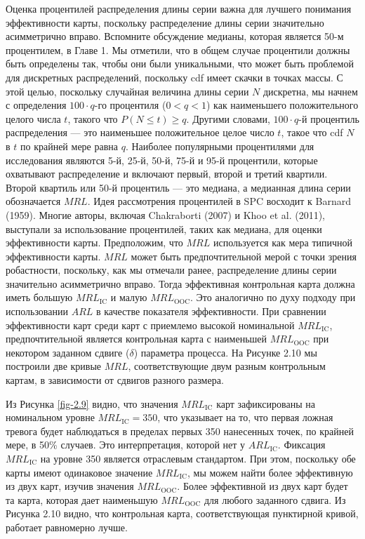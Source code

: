 Оценка процентилей распределения длины серии важна для лучшего понимания эффективности карты, поскольку распределение длины серии значительно асимметрично вправо. Вспомните обсуждение медианы, которая является 50-м процентилем, в Главе 1. Мы отметили, что в общем случае процентили должны быть определены так, чтобы они были уникальными, что может быть проблемой для дискретных распределений, поскольку cdf имеет скачки в точках массы. С этой целью, поскольку случайная величина длины серии \(N\) дискретна, мы начнем с определения \(100 \cdot q\)-го процентиля (\(0 < q < 1\)) как наименьшего положительного целого числа \(t\), такого что \(P(N \leq t) \geq q\). Другими словами, \(100 \cdot q\)-й процентиль распределения — это наименьшее положительное целое число \(t\), такое что cdf \(N\) в \(t\) по крайней мере равна \(q\). Наиболее популярными процентилями для исследования являются 5-й, 25-й, 50-й, 75-й и 95-й процентили, которые охватывают распределение и включают первый, второй и третий квартили. Второй квартиль или 50-й процентиль — это медиана, а медианная длина серии обозначается \(MRL\). Идея рассмотрения процентилей в SPC восходит к Barnard (1959). Многие авторы, включая Chakraborti (2007) и Khoo et al. (2011), выступали за использование процентилей, таких как медиана, для оценки эффективности карты. Предположим, что \(MRL\) используется как мера типичной эффективности карты. \(MRL\) может быть предпочтительной мерой с точки зрения робастности, поскольку, как мы отмечали ранее, распределение длины серии значительно асимметрично вправо. Тогда эффективная контрольная карта должна иметь большую \(MRL_{\text{IC}}\) и малую \(MRL_{\text{OOC}}\). Это аналогично по духу подходу при использовании \(ARL\) в качестве показателя эффективности. При сравнении эффективности карт среди карт с приемлемо высокой номинальной \(MRL_{\text{IC}}\), предпочтительной является контрольная карта с наименьшей \(MRL_{\text{OOC}}\) при некотором заданном сдвиге (\(\delta\)) параметра процесса. На Рисунке 2.10 мы построили две кривые \(MRL\), соответствующие двум разным контрольным картам, в зависимости от сдвигов разного размера.

Из Рисунка \ref{fig-2.9} видно, что значения \(MRL_{\text{IC}}\) карт зафиксированы на номинальном уровне \(MRL_{\text{IC}} = 350\), что указывает на то, что первая ложная тревога будет наблюдаться в пределах первых 350 нанесенных точек, по крайней мере, в 50\% случаев. Это интерпретация, которой нет у \(ARL_{\text{IC}}\). Фиксация \(MRL_{\text{IC}}\) на уровне 350 является отраслевым стандартом. При этом, поскольку обе карты имеют одинаковое значение \(MRL_{\text{IC}}\), мы можем найти более эффективную из двух карт, изучив значения \(MRL_{\text{OOC}}\). Более эффективной из двух карт будет та карта, которая дает наименьшую \(MRL_{\text{OOC}}\) для любого заданного сдвига. Из Рисунка 2.10 видно, что контрольная карта, соответствующая пунктирной кривой, работает равномерно лучше.

